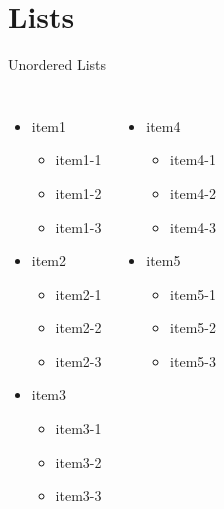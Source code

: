 \section{Lists}

\begin{frame}{Unordered Lists}
\begin{columns}
\begin{itemize}
    \item item1
    \begin{itemize}
        \item item1-1
        \item item1-2
        \item item1-3
    \end{itemize}
    \item item2
    \begin{itemize}
        \item item2-1
        \item item2-2
        \item item2-3
    \end{itemize}
    \item item3
    \begin{itemize}
        \item item3-1
        \item item3-2
        \item item3-3
    \end{itemize}
\end{itemize}

\begin{itemize} \itemsep2em
    \item item4
    \begin{itemize} \itemsep1em
        \item item4-1
        \item item4-2
        \item item4-3
    \end{itemize}
    \item item5
    \begin{itemize} \itemsep1em
        \item item5-1
        \item item5-2
        \item item5-3
    \end{itemize}
\end{itemize}
\end{columns}
\end{frame}

